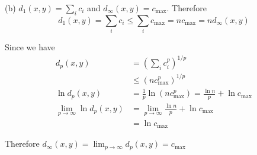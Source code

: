 \documentclass[12pt]{article}
\begin{document}
(b) $d_1(x,y) = \sum_i c_i$ and $d_{\infty} (x,y) = c_{\max}$. Therefore $$d_1(x,y) = \sum_i c_i \leq \sum_i c_{\max} = n c_{\max} = n d_{\infty} (x,y) $$ 
\QED

Since we have $$ \begin{aligned}
	d_p(x,y) &= (\sum_i c_i^p)^{1/p} \\
			& \leq (n c_{\max}^p )^{1/p} \\
	\ln d_p(x,y) &= \frac{1}{p} \ln (n c_{\max}^p) = \frac{\ln n}{p} + \ln c_{\max} \\
	\lim_{p \rightarrow \infty}	\ln d_p(x,y) &= \lim_{p \rightarrow \infty} \frac{\ln n}{p} + \ln c_{\max}  \\
	  &= \ln c_{\max}
\end{aligned}
$$

Therefore $d_{\infty} (x,y) = \lim_{p \rightarrow \infty} d_p(x,y) = c_{\max}$
\end{document}
